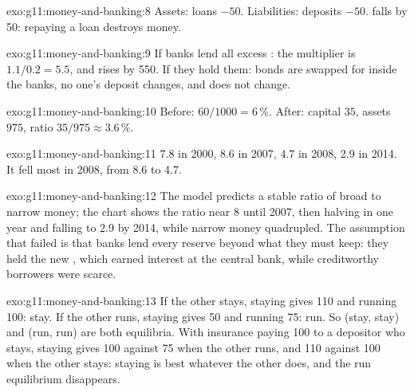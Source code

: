 \begin{solution}{exo:g11:money-and-banking:8}
Assets: loans $-50$. Liabilities: deposits $-50$.  falls by 50: repaying a loan destroys money.
\end{solution}

\begin{solution}{exo:g11:money-and-banking:9}
If banks lend all excess : the multiplier is $1.1/0.2 = 5.5$, and  rises by 550. If they hold them: bonds are swapped for  inside the banks,
no one's deposit changes, and  does not change.
\end{solution}

\begin{solution}{exo:g11:money-and-banking:10}
Before: $60/1000 = 6\,\%$. After: capital $35$, assets $975$, ratio $35/975 \approx 3.6\,\%$.
\end{solution}

\begin{solution}{exo:g11:money-and-banking:11}
7.8 in 2000, 8.6 in 2007, 4.7 in 2008, 2.9 in 2014. It fell most in 2008, from 8.6 to 4.7.
\end{solution}

\begin{solution}{exo:g11:money-and-banking:12}
The model predicts a stable ratio of broad to narrow money; the chart shows the ratio near 8 until 2007, then halving in one year and falling to 2.9 by 2014, while narrow
money quadrupled. The assumption that failed is that banks lend every reserve beyond what they must keep: they held the new , which earned interest at the
central bank, while creditworthy borrowers were scarce.
\end{solution}

\begin{solution}{exo:g11:money-and-banking:13}
If the other stays, staying gives 110 and running 100: stay. If the other runs, staying gives 50 and running 75: run. So (stay, stay) and (run, run) are both equilibria.
With insurance paying 100 to a depositor who stays, staying gives 100 against 75 when the other runs, and 110 against 100 when the other stays: staying is best whatever
the other does, and the run equilibrium disappears.
\end{solution}

